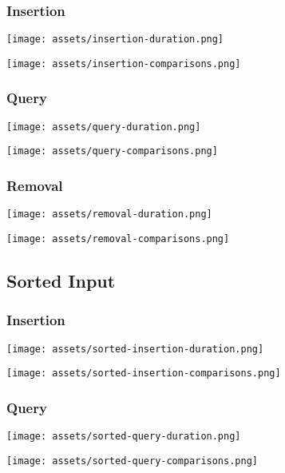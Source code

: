 \documentclass[12pt]{elsarticle}
\begin{document}
\subsubsection{Insertion}
\begin{center}\texttt{[image: assets/insertion-duration.png]}\end{center}
\begin{center}\texttt{[image: assets/insertion-comparisons.png]}\end{center}
\subsubsection{Query}
\begin{center}\texttt{[image: assets/query-duration.png]}\end{center}
\begin{center}\texttt{[image: assets/query-comparisons.png]}\end{center}
\subsubsection{Removal}
\begin{center}\texttt{[image: assets/removal-duration.png]}\end{center}
\begin{center}\texttt{[image: assets/removal-comparisons.png]}\end{center}

\subsection{Sorted Input}
\subsubsection{Insertion}
\begin{center}\texttt{[image: assets/sorted-insertion-duration.png]}\end{center}
\begin{center}\texttt{[image: assets/sorted-insertion-comparisons.png]}\end{center}
\subsubsection{Query}
\begin{center}\texttt{[image: assets/sorted-query-duration.png]}\end{center}
\begin{center}\texttt{[image: assets/sorted-query-comparisons.png]}\end{center}
\end{document}
